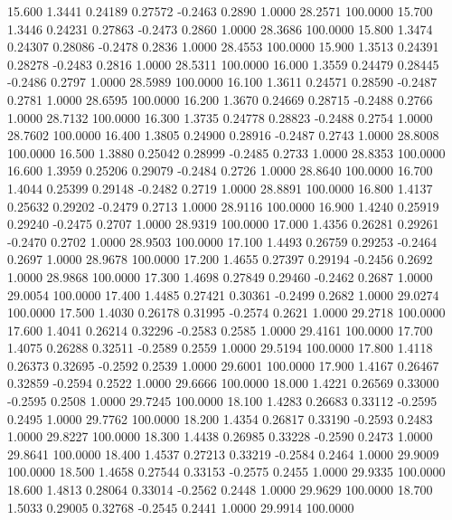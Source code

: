   15.600   1.3441   0.24189   0.27572  -0.2463   0.2890   1.0000  28.2571 100.0000
  15.700   1.3446   0.24231   0.27863  -0.2473   0.2860   1.0000  28.3686 100.0000
  15.800   1.3474   0.24307   0.28086  -0.2478   0.2836   1.0000  28.4553 100.0000
  15.900   1.3513   0.24391   0.28278  -0.2483   0.2816   1.0000  28.5311 100.0000
  16.000   1.3559   0.24479   0.28445  -0.2486   0.2797   1.0000  28.5989 100.0000
  16.100   1.3611   0.24571   0.28590  -0.2487   0.2781   1.0000  28.6595 100.0000
  16.200   1.3670   0.24669   0.28715  -0.2488   0.2766   1.0000  28.7132 100.0000
  16.300   1.3735   0.24778   0.28823  -0.2488   0.2754   1.0000  28.7602 100.0000
  16.400   1.3805   0.24900   0.28916  -0.2487   0.2743   1.0000  28.8008 100.0000
  16.500   1.3880   0.25042   0.28999  -0.2485   0.2733   1.0000  28.8353 100.0000
  16.600   1.3959   0.25206   0.29079  -0.2484   0.2726   1.0000  28.8640 100.0000
  16.700   1.4044   0.25399   0.29148  -0.2482   0.2719   1.0000  28.8891 100.0000
  16.800   1.4137   0.25632   0.29202  -0.2479   0.2713   1.0000  28.9116 100.0000
  16.900   1.4240   0.25919   0.29240  -0.2475   0.2707   1.0000  28.9319 100.0000
  17.000   1.4356   0.26281   0.29261  -0.2470   0.2702   1.0000  28.9503 100.0000
  17.100   1.4493   0.26759   0.29253  -0.2464   0.2697   1.0000  28.9678 100.0000
  17.200   1.4655   0.27397   0.29194  -0.2456   0.2692   1.0000  28.9868 100.0000
  17.300   1.4698   0.27849   0.29460  -0.2462   0.2687   1.0000  29.0054 100.0000
  17.400   1.4485   0.27421   0.30361  -0.2499   0.2682   1.0000  29.0274 100.0000
  17.500   1.4030   0.26178   0.31995  -0.2574   0.2621   1.0000  29.2718 100.0000
  17.600   1.4041   0.26214   0.32296  -0.2583   0.2585   1.0000  29.4161 100.0000
  17.700   1.4075   0.26288   0.32511  -0.2589   0.2559   1.0000  29.5194 100.0000
  17.800   1.4118   0.26373   0.32695  -0.2592   0.2539   1.0000  29.6001 100.0000
  17.900   1.4167   0.26467   0.32859  -0.2594   0.2522   1.0000  29.6666 100.0000
  18.000   1.4221   0.26569   0.33000  -0.2595   0.2508   1.0000  29.7245 100.0000
  18.100   1.4283   0.26683   0.33112  -0.2595   0.2495   1.0000  29.7762 100.0000
  18.200   1.4354   0.26817   0.33190  -0.2593   0.2483   1.0000  29.8227 100.0000
  18.300   1.4438   0.26985   0.33228  -0.2590   0.2473   1.0000  29.8641 100.0000
  18.400   1.4537   0.27213   0.33219  -0.2584   0.2464   1.0000  29.9009 100.0000
  18.500   1.4658   0.27544   0.33153  -0.2575   0.2455   1.0000  29.9335 100.0000
  18.600   1.4813   0.28064   0.33014  -0.2562   0.2448   1.0000  29.9629 100.0000
  18.700   1.5033   0.29005   0.32768  -0.2545   0.2441   1.0000  29.9914 100.0000
